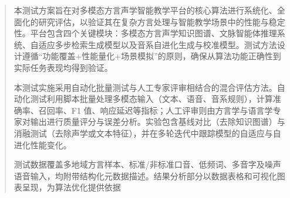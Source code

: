 

\begin{abstract}
本测试方案旨在对多模态方言声学智能教学平台的核心算法进行系统化、全面化的研究评估，以验证其在复杂方言处理与智能教学场景中的性能与稳定性。平台包含四个关键模块：多模态方言声学知识图谱、文脉智能体推理系统、自适应多步检索生成模型以及音系自进化生成与校准模型。测试方法设计遵循“功能覆盖+性能量化+场景模拟”的原则，确保从算法功能正确性到实际任务表现均得到验证。

本测试实施采用自动化批量测试与人工专家评审相结合的混合评估方法。自动化测试利用脚本批量处理多模态输入（文本、语音、音系规则），计算准确率、召回率、F1 值、响应延迟等指标；人工评审则由方言学与语言学专家对输出进行质量评分与误差分析。实验包含基线对比（去除知识图谱）与消融测试（去除声学或文本特征），并在多轮迭代中跟踪模型的自适应与自进化性能变化。

测试数据覆盖多地域方言样本、标准/非标准口音、低频词、多音字及噪声语音输入，均附带结构化元数据描述。结果分析部分以数据表格和可视化图表呈现，为算法优化提供依据

\end{abstract}

